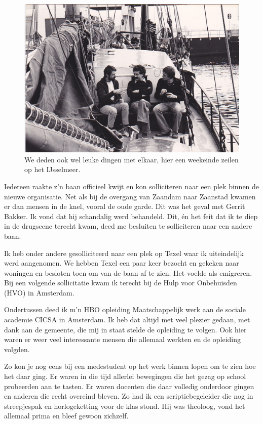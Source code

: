 \documentclass[10pt,twoside, openright]{memoir}
\begin{document}
\begin{figure}
\includegraphics[width=\textwidth]{img/ch42/desoos_0004}
\caption*{\footnotesize We deden ook wel leuke dingen met elkaar, hier een weekeinde zeilen op het IJsselmeer.}
\end{figure}

Iedereen raakte z’n baan officieel kwijt en kon solliciteren naar een plek binnen de nieuwe organisatie. Net als bij de overgang van Zaandam naar Zaanstad kwamen er dan mensen in de knel, vooral de oude garde. Dit was het geval met Gerrit Bakker. Ik vond dat hij schandalig werd behandeld. Dit, én het feit dat ik te diep in de drugscene terecht kwam, deed me besluiten te solliciteren naar een andere baan. 

Ik heb onder andere gesolliciteerd naar een plek op Texel waar ik uiteindelijk werd aangenomen. We hebben Texel een paar keer bezocht en gekeken naar woningen en besloten toen om van de baan af te zien. Het voelde als emigreren. Bij een volgende sollicitatie kwam ik terecht bij de Hulp voor Onbehuisden (HVO) in Amsterdam.

Ondertussen deed ik m’n HBO opleiding Maatschappelijk werk aan de sociale academie CICSA in Amsterdam. Ik heb dat altijd met veel plezier gedaan, met dank aan de gemeente, die mij in staat stelde de opleiding te volgen. Ook hier waren er weer veel interessante mensen die allemaal werkten en de opleiding volgden. 

Zo kon je nog eens bij een medestudent op het werk binnen lopen om te zien hoe het daar ging. Er waren in die tijd allerlei bewegingen die het gezag op school probeerden aan te tasten. Er waren docenten die daar volledig onderdoor gingen en anderen die recht overeind bleven. Zo had ik een scriptiebegeleider die nog in streepjespak en horlogeketting voor de klas stond. Hij was theoloog, vond het allemaal prima en bleef gewoon zichzelf. 
\end{document}
